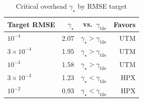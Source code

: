 \begin{table}[t]
\centering
\caption{Critical overhead $\gamma_\star$ by RMSE target}
\label{tab:gamma_star}
\footnotesize
\setlength{\tabcolsep}{3pt}
\begin{tabular}{lrrr}
\toprule
Target RMSE & $\gamma_\star$ & vs.\ $\gamma_{\mathrm{tile}}$ & Favors \\
\midrule
$10^{-4}$ & 2.07 & $\gamma_\star > \gamma_{\mathrm{tile}}$ & UTM \\
$3\times10^{-4}$ & 1.95 & $\gamma_\star > \gamma_{\mathrm{tile}}$ & UTM \\
$10^{-3}$ & 1.58 & $\gamma_\star > \gamma_{\mathrm{tile}}$ & UTM \\
$3\times10^{-3}$ & 1.23 & $\gamma_\star < \gamma_{\mathrm{tile}}$ & HPX \\
$10^{-2}$ & 0.93 & $\gamma_\star < \gamma_{\mathrm{tile}}$ & HPX \\
\bottomrule
\end{tabular}
\end{table}

